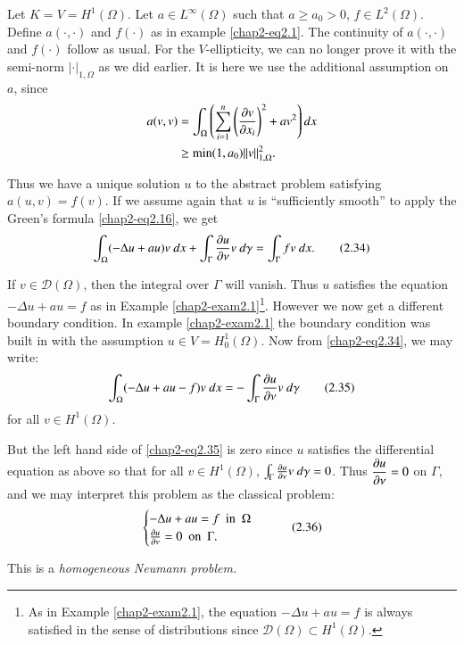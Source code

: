 \begin{example}\label{chap2-exam2.2}
Let $K=V=H^{1}(\Omega)$. Let $a\in L^{\infty}(\Omega)$ such that
$a\geq a_{0}>0$, $f\in L^{2}(\Omega)$. Define $a(\cdot,\cdot)$ and
$f(\cdot)$ as in example \eqref{chap2-eq2.1}. The continuity of
$a(\cdot,\cdot)$ and $f(\cdot)$ follow as usual. For the
$V$-ellipticity, we can no longer prove it with the semi-norm
$|\cdot|_{1,\Omega}$ as we did earlier. It is here we use the
additional assumption on $a$, since
\begin{align*}
a(v,v) &= \int_{\Omega}\left(\sum^{n}_{i=1}\left(\frac{\partial v}{\partial
  x_{i}}\right)^{2}+av^{2}\right)dx\\ 
&\geq \min (1,a_{0})||v||^{2}_{1,\Omega}.
\end{align*}

Thus we have a unique solution $u$ to the abstract problem satisfying
$a(u,v)=f(v)$. If we assume again that $u$ is ``sufficiently smooth''
to apply the Green's formula \eqref{chap2-eq2.16}, we get
\begin{equation*}
\int_{\Omega}(-\Delta u+au)v\ dx+\int_{\Gamma}\frac{\p u}{\p
  \nu}v\ d\gamma=\int_{\Gamma}fv\ dx.\tag{2.34}\label{chap2-eq2.34}
\end{equation*}

If $v\in\mathscr{D}(\Omega)$, then the integral over $\Gamma$ will
vanish. Thus $u$ satisfies the equation\pageoriginale $-\Delta u+au=f$
as in Example \ref{chap2-exam2.1}\footnote[1]{As in Example
  \ref{chap2-exam2.1}, the equation $-\Delta u+au=f$ is always
  satisfied in the sense of distributions since
  $\mathscr{D}(\Omega)\subset H^{1}(\Omega)$.}. However we now get a
different boundary condition. In example \eqref{chap2-exam2.1} the
boundary condition was built in with the assumption $u\in
V=H^{1}_{0}(\Omega)$. Now from \eqref{chap2-eq2.34}, we may write:
\begin{equation*}
\int_{\Omega}(-\Delta u+au-f)v\ dx=-\int_{\Gamma}\frac{\p u}{\p
  \nu}v\ d\gamma\tag{2.35}\label{chap2-eq2.35}
\end{equation*}
for all $v\in H^{1}(\Omega)$.

But the left hand side of \eqref{chap2-eq2.35} is zero since $u$
satisfies the differential equation as above so that for all $v\in
H^{1}(\Omega)$, $\int_{\Gamma}\frac{\p u}{\p \nu}v\ d\gamma=0$. Thus
$\dfrac{\partial u}{\partial \nu}=0$ on $\Gamma$, and we may interpret this
problem as the classical problem:
\begin{equation*}
\begin{cases}
-\Delta u+au=f\text{~ in~ } \Omega\\
\frac{\partial u}{\partial \nu}=0\text{~ on~ }\Gamma.
\end{cases}\tag{2.36}\label{chap2-eq2.36}
\end{equation*}

This is a {\em homogeneous Neumann problem.}
\end{example}

